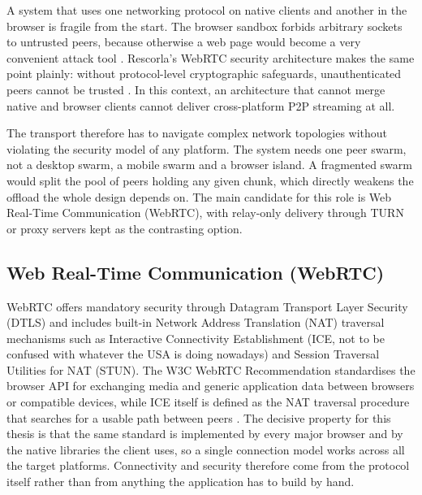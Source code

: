 \par A system that uses one networking protocol on native clients and another in the browser is fragile from the start. The browser sandbox forbids arbitrary sockets to untrusted peers, because otherwise a web page would become a very convenient attack tool \cite{webrtc_security}. Rescorla's WebRTC security architecture makes the same point plainly: without protocol-level cryptographic safeguards, unauthenticated peers cannot be trusted \cite{webrtc_security}. In this context, an architecture that cannot merge native and browser clients cannot deliver cross-platform P2P streaming at all.

\par The transport therefore has to navigate complex network topologies without violating the security model of any platform. The system needs one peer swarm, not a desktop swarm, a mobile swarm and a browser island. A fragmented swarm would split the pool of peers holding any given chunk, which directly weakens the offload the whole design depends on. The main candidate for this role is Web Real-Time Communication (WebRTC), with relay-only delivery through TURN or proxy servers kept as the contrasting option.

\subsection{Web Real-Time Communication (WebRTC)}
\indent \par WebRTC offers mandatory security through Datagram Transport Layer Security (DTLS) and includes built-in Network Address Translation (NAT) traversal mechanisms such as Interactive Connectivity Establishment (ICE, not to be confused with whatever the USA is doing nowadays) and Session Traversal Utilities for NAT (STUN). The W3C WebRTC Recommendation standardises the browser API for exchanging media and generic application data between browsers or compatible devices, while ICE itself is defined as the NAT traversal procedure that searches for a usable path between peers \cite{webrtc_w3c,ice_rfc8445}. The decisive property for this thesis is that the same standard is implemented by every major browser and by the native libraries the client uses, so a single connection model works across all the target platforms. Connectivity and security therefore come from the protocol itself rather than from anything the application has to build by hand.

